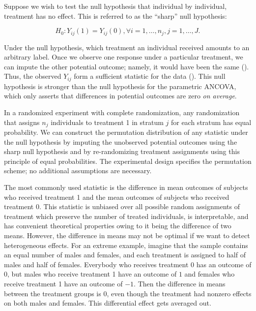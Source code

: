 \documentclass[12pt]{article}
\begin{document}
Suppose we wish to test the null hypothesis that individual by individual, treatment has no effect.
This is referred to as the ``sharp'' null hypothesis:

$$H_0: Y_{ij}(1) = Y_{ij}(0), \forall i = 1, \dots, n_j, j = 1,\dots, J.$$


Under the null hypothesis, which treatment an individual received amounts to an arbitrary label.
Once we observe one response under a particular treatment, we can impute the other potential outcome; namely, it would have been the same  (\cite{rosenbaum_covariance_2002}).
Thus, the observed $Y_{ij}$ form a sufficient statistic for the data (\cite{pesarin_permutation_2010}).
This null hypothesis is stronger than the null hypothesis for the parametric ANCOVA, which only asserts that differences in potential outcomes are zero \textit{on average}.

In a randomized experiment with complete randomization, any randomization that assigns $n_j$ individuals to treatment 1 in stratum $j$ for each stratum has equal probability.
We can construct the permutation distribution of any statistic under the null hypothesis by imputing the unobserved potential outcomes using the sharp null hypothesis and by re-randomizing treatment assignments using this principle of equal probabilities.
The experimental design specifies the permutation scheme; no additional assumptions are necessary.

The most commonly used statistic is the difference in mean outcomes of subjects who received treatment 1 and the mean outcomes of subjects who received treatment 0.  
This statistic is unbiased over all possible random assignments of treatment which preserve the number of treated individuals,
is interpretable, 
and has convenient theoretical properties owing to it being the difference of two means.
However, the difference in means may not be optimal if we want to detect heterogeneous effects.  
For an extreme example, imagine that the sample contains an equal number of males and females, and each treatment is assigned to half of males and half of females.  
Everybody who receives treatment 0 has an outcome of 0, but males who receive treatment 1 have an outcome of $1$ and females who receive treatment 1 have an outcome of $-1$.  
Then the difference in means between the treatment groups is $0$, even though the treatment had nonzero effects on both males and females.  
This differential effect gets averaged out.
\end{document}
